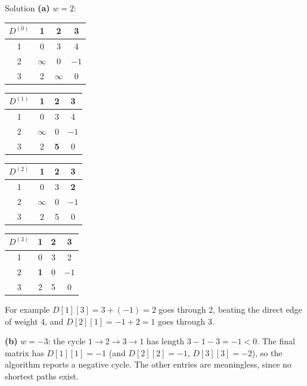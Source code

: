 \documentclass[10pt,aspectratio=169,xcolor=table]{beamer}
\newcommand{\nw}[1]{\textcolor{mRed}{\textbf{#1}}}
\begin{document}
\begin{frame}{Solution}
  \small
  \textbf{(a)} $w = 2$:

  \medskip
  \begin{center}
  \renewcommand{\arraystretch}{1.2}
  \begin{tabular}{c|ccc}
      $D^{(0)}$ & 1 & 2 & 3 \\ \hline
    1 & 0 & 3 & 4 \\
    2 & $\infty$ & 0 & $-1$ \\
    3 & 2 & $\infty$ & 0 \\
  \end{tabular}
  \quad
  \begin{tabular}{c|ccc}
      $D^{(1)}$ & 1 & 2 & 3 \\ \hline
    1 & 0 & 3 & 4 \\
    2 & $\infty$ & 0 & $-1$ \\
    3 & 2 & \nw{5} & 0 \\
  \end{tabular}
  \quad
  \begin{tabular}{c|ccc}
      $D^{(2)}$ & 1 & 2 & 3 \\ \hline
    1 & 0 & 3 & \nw{2} \\
    2 & $\infty$ & 0 & $-1$ \\
    3 & 2 & 5 & 0 \\
  \end{tabular}
  \quad
  \begin{tabular}{c|ccc}
      $D^{(3)}$ & 1 & 2 & 3 \\ \hline
    1 & 0 & 3 & 2 \\
    2 & \nw{1} & 0 & $-1$ \\
    3 & 2 & 5 & 0 \\
  \end{tabular}
  \end{center}

  \medskip
  For example $D[1][3] = 3 + (-1) = 2$ goes through 2, beating the direct
  edge of weight 4, and $D[2][1] = -1 + 2 = 1$ goes through 3.

  \pause
  \bigskip
  \textbf{(b)} $w = -3$: the cycle $1 \to 2 \to 3 \to 1$ has length
  $3 - 1 - 3 = -1 < 0$. The final matrix has $D[1][1] = -1$ (and
  $D[2][2] = -1$, $D[3][3] = -2$), so the algorithm reports a negative
  cycle. The other entries are meaningless, since no shortest paths exist.
\end{frame}
\end{document}
